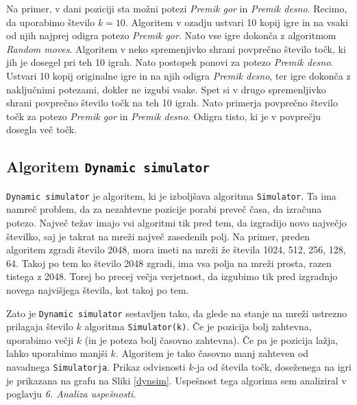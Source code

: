 \documentclass{article}
\begin{document}
Na primer, v dani poziciji sta možni potezi \emph{Premik gor} in \emph{Premik desno}. Recimo, da uporabimo število $k=10$. Algoritem v ozadju ustvari 10 kopij igre in na vsaki od njih najprej odigra potezo \emph{Premik gor}. Nato vse igre dokonča z algoritmom \emph{Random moves}. Algoritem v neko spremenjivko shrani povprečno število točk, ki jih je dosegel pri teh 10 igrah. Nato postopek ponovi za potezo \emph{Premik desno}. Ustvari 10 kopij originalne igre in na njih odigra \emph{Premik desno}, ter igre dokonča z naključnimi potezami, dokler ne izgubi vsake. Spet si v drugo spremenljivko shrani povprečno število točk na teh 10 igrah. Nato primerja povprečno število točk za potezo \emph{Premik gor} in \emph{Premik desno}. Odigra tisto, ki je v povprečju dosegla več točk.

\subsection{Algoritem \texttt{Dynamic simulator}}

\texttt{Dynamic simulator} je algoritem, ki je izboljšava algoritma \texttt{Simulator}. Ta ima namreč problem, da za nezahtevne pozicije porabi preveč časa, da izračuna potezo. Največ težav imajo vsi algoritmi tik pred tem, da izgradijo novo največjo številko, saj je takrat na mreži največ zasedenih polj. Na primer, preden algoritem zgradi število 2048, mora imeti na mreži že števila 1024, 512, 256, 128, 64. Takoj po tem ko število 2048 zgradi, ima vsa polja na mreži prosta, razen tistega z 2048. Torej bo precej večja verjetnost, da izgubimo tik pred izgradnjo novega najvišjega števila, kot takoj po tem. 

Zato je \texttt{Dynamic simulator} sestavljen tako, da glede na stanje na mreži ustrezno prilagaja število $k$ algoritma \texttt{Simulator(k)}. Če je pozicija bolj zahtevna, uporabimo večji $k$ (in je poteza bolj časovno zahtevna). Če pa je pozicija lažja, lahko uporabimo manjši $k$. Algoritem je tako časovno manj zahteven od navadnega \texttt{Simulatorja}. Prikaz odvisnosti $k$-ja od števila točk, doseženega na igri je prikazana na grafu na Sliki \ref{dynsim}. Uspešnost tega algorima sem analiziral v poglavju \textit{6. Analiza uspešnosti}.
\end{document}
